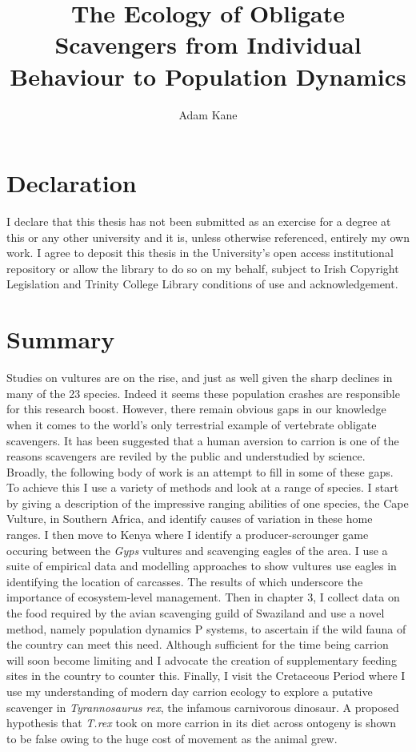 \documentclass[twoside,12pt]{mythesis} %
\title{The \uppercase{e}cology of \uppercase{o}bligate \uppercase{s}cavengers from \uppercase{i}ndividual \uppercase{b}ehaviour to \uppercase{p}opulation \uppercase{d}ynamics}
\author{Adam Kane}
\begin{document}


\maketitle %

\chapter*{Declaration}
I declare that this thesis has not been submitted as an exercise for a degree at this or any other university and it is, unless otherwise referenced, entirely my own work.
I agree to deposit this thesis in the University's open access institutional repository or allow the library to do so on my behalf, subject to Irish Copyright Legislation and Trinity College Library conditions of use and acknowledgement.

\vspace{10 mm}


\chapter*{Summary}
Studies on vultures are on the rise, and just as well given the sharp declines in many of the 23 species. Indeed it seems these population crashes are responsible for this research boost. However, there remain obvious gaps in our knowledge when it comes to the world's only terrestrial example of vertebrate obligate scavengers. It has been suggested that a human aversion to carrion is one of the reasons scavengers are reviled by the public and understudied by science. Broadly, the following body of work is an attempt to fill in some of these gaps. To achieve this I use a variety of methods and look at a range of species. I start by giving a description of the impressive ranging abilities of one species, the Cape Vulture, in Southern Africa, and identify causes of variation in these home ranges. I then move to Kenya where I identify a producer-scrounger game occuring between the \textit{Gyps} vultures and scavenging eagles of the area. I use a suite of empirical data and modelling approaches to show vultures use eagles in identifying the location of carcasses. The results of which underscore the importance of ecosystem-level management. Then in chapter 3, I collect data on the food required by the avian scavenging guild of Swaziland and use a novel method, namely population dynamics P systems, to ascertain if the wild fauna of the country can meet this need. Although sufficient for the time being carrion will soon become limiting and I advocate the creation of supplementary feeding sites in the country to counter this. Finally, I visit the Cretaceous Period where I use my understanding of modern day carrion ecology to explore a putative scavenger in \textit{Tyrannosaurus rex}, the infamous carnivorous dinosaur. A proposed hypothesis that \textit{T.rex} took on more carrion in its diet across ontogeny is shown to be false owing to the huge cost of movement as the animal grew. 
\end{document}
